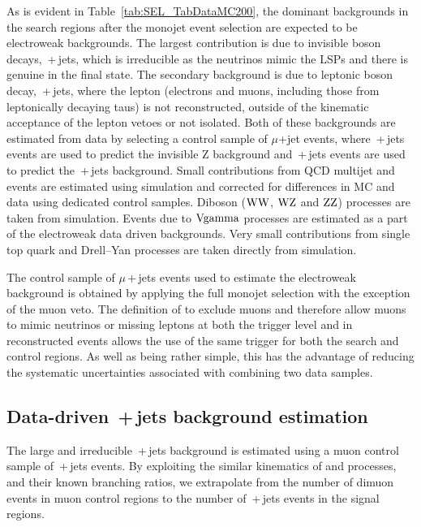As is evident in Table~\ref{tab:SEL_TabDataMC200}, the dominant backgrounds in the search regions after the monojet event selection are expected to be electroweak backgrounds.
The largest contribution is due to invisible \Z{} boson decays, \znunubr{}\,+\,jets, which is irreducible as the neutrinos mimic the \ac{LSP}s and there is genuine \MET in the final state. 
The secondary background is due to leptonic \W{} boson decay, \wlnubr{}\,+\,jets, where the lepton (electrons and muons, including those from leptonically decaying taus) is not reconstructed, outside of the kinematic acceptance of the lepton vetoes or not isolated.
Both of these backgrounds are estimated from data by selecting a control sample of $\mu$+jet events, where \zmumubr{}\,+\,jets events are used to predict the invisible Z background and \wmunubr{}\,+\,jets events are used to predict the \wlnubr{}\,+\,jets background.
Small contributions from \ac{QCD} multijet and \ttbar{} events are estimated using simulation and corrected for differences in MC and data using dedicated control samples.
Diboson ($\W\W${}, $\W\Z${} and $\Z\Z${}) processes are taken from simulation. Events due to $\rm{V}\gamma$ processes are estimated as a part of the electroweak data driven backgrounds.
Very small contributions from single top quark and Drell--Yan processes are taken directly from simulation.


The control sample of $\mu$\,+\,jets events used to estimate the electroweak background is 
obtained by applying the full monojet selection with the exception of the muon veto.
The definition of \METmu to exclude muons and therefore allow muons to mimic neutrinos or missing leptons at both the trigger level and in reconstructed events allows the use of the same trigger for both the search and control regions. 
As well as being rather simple, this has the advantage of reducing the systematic uncertainties associated with combining two data samples.

\subsection{Data-driven \znunubr{}\,+\,jets background estimation}
\label{sec:znunu}

The large and irreducible \znunubr{}\,+\,jets background is estimated using a muon control sample of \zmumubr{}\,+\,jets events.
By exploiting the similar kinematics of \znunu and \zmumu processes, and their known branching ratios, we extrapolate from the number of dimuon events in muon control regions to the number of \znunubr{}\,+\,jets events in the signal regions.

